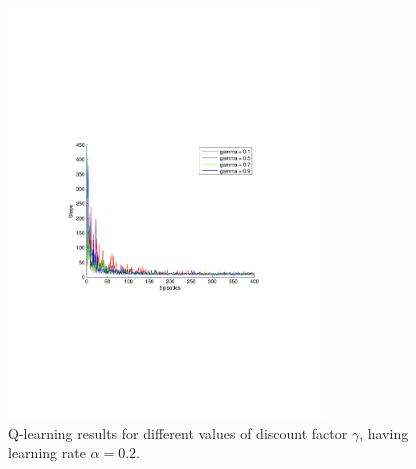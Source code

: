 \documentclass[a4paper,11pt]{article}
\begin{document}
~
\begin{figure}[h!]
  \centering
    \includegraphics[trim=4cm 8.5cm 4cm 8.5cm,clip,width=0.75\textwidth]{figures/qla02.pdf}
    \caption{Q-learning results for different values of discount factor $\gamma$, having learning rate $\alpha = 0.2$.}
    \label{q02}
\end{figure}
\end{document}
